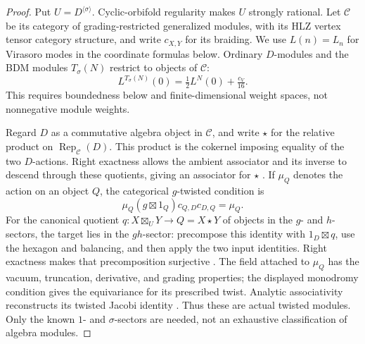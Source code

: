 \begin{proof}
Put \(U=D^{\langle\sigma\rangle}\).  Cyclic-orbifold regularity
\cite[Theorem~5.24 and Corollary~5.25]{CarnahanMiyamoto} makes
\(U\) strongly rational.  Let \(\mathcal C\) be its category of
grading-restricted generalized modules, with its HLZ vertex tensor
category structure, and write \(c_{X,Y}\) for its braiding.
We use \(L(n)=L_n\) for Virasoro modes in the coordinate formulas below.
Ordinary \(D\)-modules and the BDM modules \(T_\sigma(N)\)
restrict to objects of \(\mathcal C\):
\[
 L^{T_\sigma(N)}(0)=\tfrac12L^N(0)+\tfrac{c_V}{16}.
\]
This requires boundedness below and finite-dimensional weight spaces,
not nonnegative module weights.

Regard \(D\) as a commutative algebra object in \(\mathcal C\), and
write \(\star\) for the relative product on
\(\operatorname{Rep}_{\mathcal C}(D)\).  This product is the cokernel
imposing equality of the two \(D\)-actions.  Right exactness allows
the ambient associator and its inverse to descend through these
quotients, giving an associator for \(\star\)
\cite[Theorems~2.51--2.53]{CKMExtensions}.
If \(\mu_Q\) denotes the action on an object \(Q\), the categorical
\(g\)-twisted condition is
\[
 \mu_Q(g\boxtimes 1_Q)c_{Q,D}c_{D,Q}=\mu_Q .
\]
For the canonical quotient \(q:X\boxtimes_U Y\to Q=X\star Y\) of
objects in the \(g\)- and \(h\)-sectors, the target lies in the \(gh\)-sector:
precompose this identity with \(1_D\boxtimes q\),
use the hexagon and balancing, and then apply the two input identities.
Right exactness makes that precomposition surjective
\cite[Proposition~2.4 and Corollary~2.5]{McRaeTwisted}.
The field attached to \(\mu_Q\) has the vacuum, truncation, derivative,
and grading properties; the displayed monodromy condition gives
the equivariance for its prescribed twist.  Analytic associativity reconstructs its twisted
Jacobi identity
\cite[Propositions~4.11 and~4.13, Remark~4.12 and Theorem~4.14]{McRaeTwisted}.
Thus these are actual twisted modules.  Only the known \(1\)- and
\(\sigma\)-sectors are needed, not an exhaustive classification of
algebra modules.


\end{proof}
